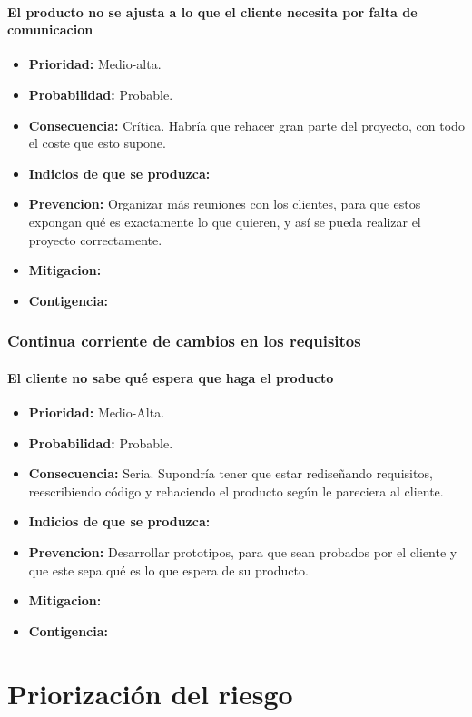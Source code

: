 \documentclass[spanish,a4paper,12pt]{report}	%
\begin{document}
\subsection*{El producto no se ajusta a lo que el cliente necesita por falta de comunicacion}			%
	\begin{itemize}
		\item \textbf {Prioridad: }Medio-alta.
		\item \textbf {Probabilidad: }Probable.
		\item \textbf {Consecuencia: }Crítica. Habría que rehacer gran parte del proyecto, con todo el coste que esto supone.
		\item \textbf {Indicios de que se produzca: }
		\item \textbf {Prevencion: }Organizar más reuniones con los clientes, para que estos expongan qué es exactamente lo que quieren, y así se pueda realizar el proyecto correctamente. 
		\item \textbf {Mitigacion: }
		\item \textbf {Contigencia: }
	\end{itemize}

%
\section{Continua corriente de cambios en los requisitos}
\subsection*{El cliente no sabe qué espera que haga el producto}		

	\begin{itemize}
		\item \textbf {Prioridad: }Medio-Alta.
		\item \textbf {Probabilidad: }Probable.
		\item \textbf {Consecuencia: }Seria. Supondría tener que estar rediseñando requisitos, reescribiendo código y rehaciendo el producto según le pareciera al cliente.
		\item \textbf {Indicios de que se produzca: }
		\item \textbf {Prevencion: }Desarrollar prototipos, para que sean probados por el cliente y que este sepa qué es lo que espera de su producto.
		\item \textbf {Mitigacion: }
		\item \textbf {Contigencia: }
	\end{itemize}


\part{Priorización del riesgo}
\end{document}
